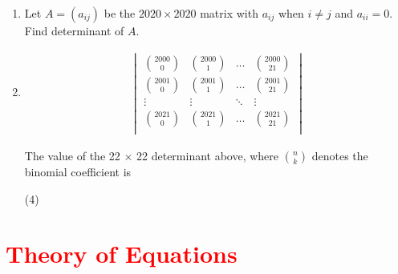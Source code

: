 \documentclass[11pt, a4paper]{article}
\begin{document}
\begin{enumerate}

	\item Let $A = \left( a_{ij} \right)$ be the $ 2020 \times 2020 $ matrix with $ a_{ij} $ when $i \neq j$ and $a_{ii} = 0$. Find determinant of $A$.
	
	\item 
	\begin{gather*}	
	\begin{vmatrix} 
	\displaystyle{\binom{2000}{0}} & \displaystyle{\binom{2000}{1}} & \ldots & \displaystyle{\binom{2000}{21}} \\[0.5cm]
	\displaystyle{\binom{2001}{0}} & \displaystyle{\binom{2001}{1}} & \ldots & \displaystyle{\binom{2001}{21}} \\[0.5cm]
	\vdots & \vdots & \ddots & \vdots \\[0.5cm]
	\displaystyle{\binom{2021}{0}} & \displaystyle{\binom{2021}{1}} & \ldots & \displaystyle{\binom{2021}{21}} \\ 
	\end{vmatrix}
	\end{gather*}
	
	The value of the 22 $\times$ 22 determinant above, where $\displaystyle{\binom{n}{k}}$ denotes the binomial coefficient is
	\begin{tasks}(4)
	\end{tasks}
\end{enumerate}















\section{\textcolor{red}{Theory of Equations}}
\end{document}
